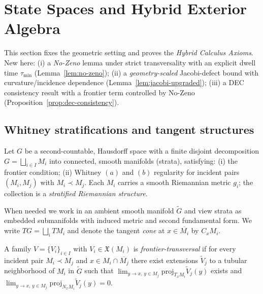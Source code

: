 \section{State Spaces and Hybrid Exterior Algebra}\label{sec:calc1}

\setcounter{lemma}{0}

This section fixes the geometric setting and proves the \emph{Hybrid Calculus Axioms}. New here:
(i) a \emph{No-Zeno} lemma under strict transversality with an explicit dwell time $\tau_{\min}$ (Lemma~\ref{lem:no-zeno});
(ii) a \emph{geometry-scaled} Jacobi-defect bound with curvature/incidence dependence (Lemma~\ref{lem:jacobi-upgraded});
(iii) a DEC consistency result with a frontier term controlled by No-Zeno (Proposition~\ref{prop:dec-consistency}).

\subsection{Whitney stratifications and tangent structures}

\begin{definition}\label{def:whitney}
Let $G$ be a second-countable, Hausdorff space with a finite disjoint decomposition $G=\bigsqcup_{i\in I} M_i$ into connected, smooth manifolds (strata), satisfying: (i) the frontier condition; (ii) Whitney $(a)$ and $(b)$ regularity for incident pairs $(M_i,M_j)$ with $M_i\prec M_j$. Each $M_i$ carries a smooth Riemannian metric $g_i$; the collection is a \emph{stratified Riemannian structure}.
\end{definition}

When needed we work in an ambient smooth manifold $\widetilde G$ and view strata as embedded submanifolds with induced metric and second fundamental form. We write $TG=\bigsqcup_i TM_i$ and denote the tangent \emph{cone} at $x\in\overline{M_i}$ by $C_xM_i$.

\begin{definition}\label{def:transversal}
A family $V=\{V_i\}_{i\in I}$ with $V_i\in\mathfrak X(M_i)$ is \emph{frontier-transversal} if for every incident pair $M_i\prec M_j$ and $x\in M_i\cap\overline{M_j}$ there exist extensions $\widetilde V_j$ to a tubular neighborhood of $M_i$ in $\widetilde G$ such that $\lim_{y\to x,\,y\in M_j}\mathrm{proj}_{T_xM_i}\widetilde V_j(y)$ exists and $\lim_{y\to x,\,y\in M_j}\mathrm{proj}_{N_xM_i}\widetilde V_j(y)=0$.
\end{definition}

